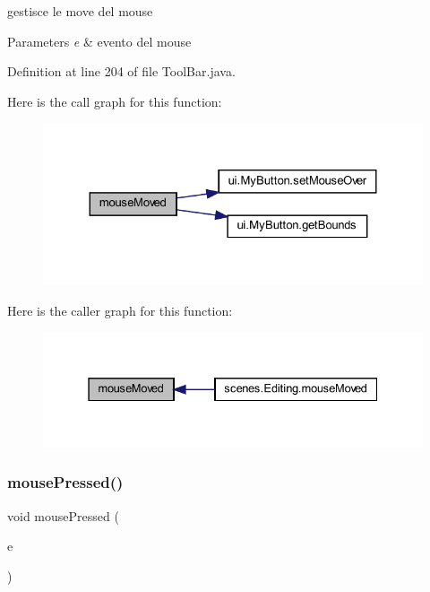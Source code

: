 gestisce le move del mouse 


\begin{DoxyParams}{Parameters}
{\em e} & evento del mouse \\
\hline
\end{DoxyParams}


Definition at line 204 of file Tool\+Bar.\+java.

Here is the call graph for this function\+:\nopagebreak
\begin{figure}[H]
\begin{center}
\leavevmode
\includegraphics[width=324pt]{classui_1_1_tool_bar_a2ca251710b65639ec80bc141edde60aa_cgraph}
\end{center}
\end{figure}
Here is the caller graph for this function\+:\nopagebreak
\begin{figure}[H]
\begin{center}
\leavevmode
\includegraphics[width=331pt]{classui_1_1_tool_bar_a2ca251710b65639ec80bc141edde60aa_icgraph}
\end{center}
\end{figure}
\mbox{\label{classui_1_1_tool_bar_aed82e1ce3dd3cf283d508c3ba3be70ef}} 
\subsubsection{\texorpdfstring{mouse\+Pressed()}{mousePressed()}}
{\footnotesize\ttfamily void mouse\+Pressed (\begin{DoxyParamCaption}\item[{Mouse\+Event}]{e }\end{DoxyParamCaption})}



